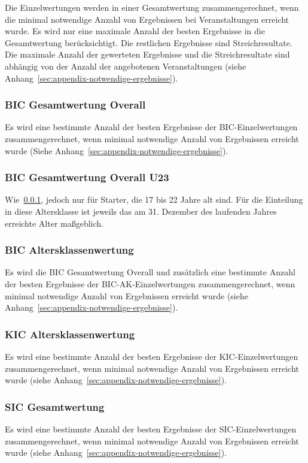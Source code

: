 Die Einzelwertungen werden in einer Gesamtwertung zusammengerechnet, wenn die minimal notwendige Anzahl von Ergebnissen bei Veranstaltungen erreicht wurde. Es wird nur eine maximale Anzahl der besten Ergebnisse in die Gesamtwertung berücksichtigt. Die restlichen Ergebnisse sind Streichresultate. Die maximale Anzahl der gewerteten Ergebnisse und die Streichresultate sind abhängig von der Anzahl der angebotenen Veranstaltungen (siehe Anhang~\ref{sec:appendix-notwendige-ergebnisse}).

\subsubsection{BIC Gesamtwertung Overall}
\label{subsec:bic-gesamtwertung-overall}
Es wird eine bestimmte Anzahl der besten Ergebnisse der BIC-Einzelwertungen zusammengerechnet, wenn minimal notwendige Anzahl von Ergebnissen erreicht wurde (Siehe Anhang~\ref{sec:appendix-notwendige-ergebnisse}).

\subsubsection{BIC Gesamtwertung Overall U23}
\label{subsec:bic-gesamtwertung-u23}
Wie~\ref{subsec:bic-gesamtwertung-overall}, jedoch nur für Starter, die 17 bis 22 Jahre alt sind. Für die Einteilung in diese Altersklasse ist jeweils das am 31. Dezember des laufenden Jahres erreichte Alter maßgeblich.

\subsubsection{BIC Altersklassenwertung}
\label{subsec:bic-ak-gesamtwertung}
Es wird die BIC Gesamtwertung Overall und zusätzlich eine bestimmte Anzahl der besten Ergebnisse der BIC-AK-Einzelwertungen zusammengerechnet, wenn minimal notwendige Anzahl von Ergebnissen erreicht wurde (siehe Anhang~\ref{sec:appendix-notwendige-ergebnisse}).

\subsubsection{KIC Altersklassenwertung}
\label{subsec:kic-gesamtwertung}
Es wird eine bestimmte Anzahl der besten Ergebnisse der KIC-Einzelwertungen zusammengerechnet, wenn minimal notwendige Anzahl von Ergebnissen erreicht wurde (siehe Anhang~\ref{sec:appendix-notwendige-ergebnisse}).

\subsubsection{SIC Gesamtwertung}
\label{subsec:sic-gesamtwertung}
Es wird eine bestimmte Anzahl der besten Ergebnisse der SIC-Einzelwertungen zusammengerechnet, wenn minimal notwendige Anzahl von Ergebnissen erreicht wurde (siehe Anhang~\ref{sec:appendix-notwendige-ergebnisse}).

